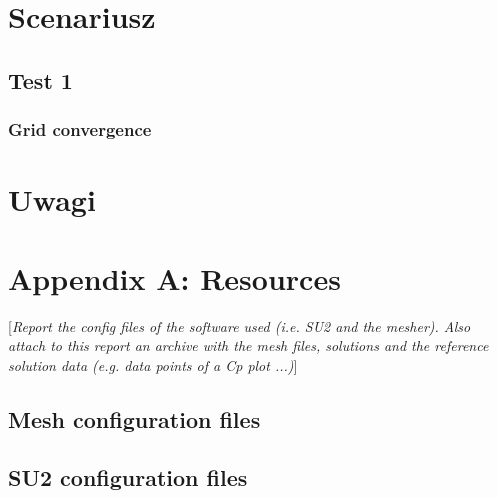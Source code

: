 \documentclass[11pt,polish, openany]{book}
\begin{document}
\chapter{Scenariusz}\label{chapt:results}
\section{Test 1}
\subsection{Grid convergence}
\chapter{Uwagi}

\pagebreak





\pagebreak

\chapter*{Appendix A: Resources}
[\textit{Report the config files of the software used (i.e. SU2 \cite{economon2015su2} and the mesher). Also attach to this report an archive with the mesh files, solutions and the reference solution data (e.g. data points of a Cp plot ...)}]
\section*{Mesh configuration files}
\section*{SU2 configuration files}
\end{document}
